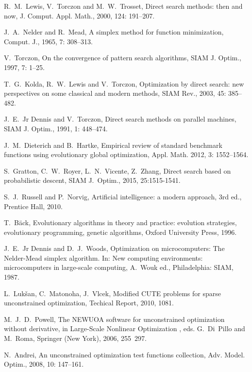 \documentclass[final,1p,times]{elsarticle}
\begin{document}
\begin{thebibliography}{99}
R.~M.~Lewis, V.~Torczon and M.~W.~Trosset,
Direct search methods: then and now,
{J. Comput. Appl. Math.},
2000, 124: 191--207.

J.~A.~Nelder and R.~Mead,
A simplex method for function minimization,
{Comput. J.}, 1965, 7: 308--313.

V.~Torczon,
On the convergence of pattern search algorithms,
{SIAM J. Optim.}, 1997, 7: 1--25.

T.~G.~Kolda, R.~W.~Lewis and V.~Torczon,
Optimization by direct search: new perspectives on some classical
and modern methods,
{SIAM Rev.}, 2003, 45: 385--482.

J.~E.~Jr Dennis and V.~Torczon,
Direct search methods on parallel machines,
{SIAM J. Optim.}, 1991, 1: 448--474.

J.~M.~Dieterich and B.~Hartke, 
Empirical review of standard benchmark functions using evolutionary global optimization,
{Appl. Math.} 2012, 3: 1552--1564.

S.~Gratton, C.~W.~Royer, L.~N.~Vicente, Z.~Zhang, Direct search
based on probabilistic descent, SIAM J.~Optim., 
2015, 25:1515-1541.

S.~J.~Russell and P.~Norvig,  Artificial intelligence: a modern
approach, 3rd ed., Prentice Hall, 2010.

T.~B{\"a}ck, 
Evolutionary algorithms in theory and practice: evolution
  strategies, evolutionary programming, genetic algorithms,
Oxford University Press, 1996.

J.~E.~Jr Dennis and D.~J.~Woods,
Optimization on microcomputers: The Nelder-Mead simplex algorithm.
In: New computing environments: microcomputers in large-scale
computing, A.~Wouk ed., Philadelphia: SIAM, 1987.

L.~Luk{\v{s}}an, C.~Matonoha, J.~Vlcek,
Modified CUTE problems for sparse unconstrained optimization,
Techical Report,
2010, 1081.


M.~J.~D.~Powell,
The NEWUOA software for unconstrained optimization without derivative, in
Large-Scale Nonlinear Optimization , eds. G.~Di~Pillo
and M.~Roma, Springer (New York), 2006, 255~297.

N.~Andrei, 
An unconstrained optimization test functions collection,
Adv. Model. Optim.,
2008, 10: 147--161.


\end{thebibliography}
\end{document}
